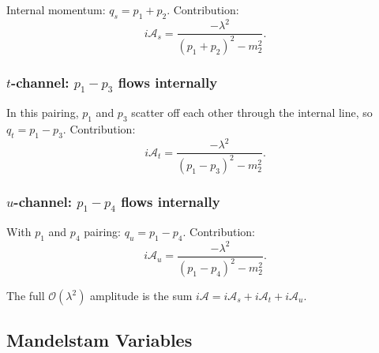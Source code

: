 \documentclass[../main.tex]{subfiles}
\begin{document}
Internal momentum: $q_s = p_1 + p_2$.  Contribution:
\begin{equation}
  i\mathcal{A}_s = \frac{-\lambda^2}{(p_1+p_2)^2 - m_2^2}.
  \label{eq:lec05:s-channel}
\end{equation}

\subsubsection*{$t$-channel: $p_1 - p_3$ flows internally}

\begin{center}
\end{center}

In this pairing, $p_1$ and $p_3$ scatter off each other through the internal line, so $q_t = p_1 - p_3$.  Contribution:
\begin{equation}
  i\mathcal{A}_t = \frac{-\lambda^2}{(p_1-p_3)^2 - m_2^2}.
  \label{eq:lec05:t-channel}
\end{equation}

\subsubsection*{$u$-channel: $p_1 - p_4$ flows internally}

With $p_1$ and $p_4$ pairing: $q_u = p_1 - p_4$.  Contribution:
\begin{equation}
  i\mathcal{A}_u = \frac{-\lambda^2}{(p_1-p_4)^2 - m_2^2}.
  \label{eq:lec05:u-channel}
\end{equation}

The full $\mathcal{O}(\lambda^2)$ amplitude is the sum $i\mathcal{A} = i\mathcal{A}_s + i\mathcal{A}_t + i\mathcal{A}_u$.

\subsection*{Mandelstam Variables}
\end{document}
